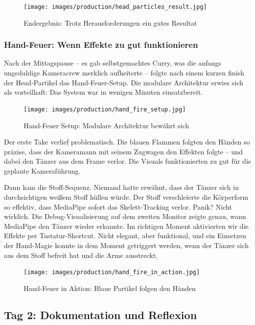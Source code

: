\begin{figure}[h]
   \centering
   \texttt{[image: images/production/head\_particles\_result.jpg]}
   \caption{Endergebnis: Trotz Herausforderungen ein gutes Resultat}
   \label{fig:head_result}
\end{figure}

\subsubsection{Hand-Feuer: Wenn Effekte zu gut funktionieren}

Nach der Mittagspause – es gab selbstgemachtes Curry, was die anfangs ungeduldige Kameracrew merklich aufheiterte – folgte nach einem kurzen finish der Head-Partikel das Hand-Feuer-Setup. Die modulare Architektur erwies sich als vorteilhaft: Das System war in wenigen Minuten einsatzbereit.

\begin{figure}[h]
   \centering
   \texttt{[image: images/production/hand\_fire\_setup.jpg]}
   \caption{Hand-Feuer Setup: Modulare Architektur bewährt sich}
   \label{fig:hand_fire_setup}
\end{figure}

Der erste Take verlief problematisch. Die blauen Flammen folgten den Händen so präzise, dass der Kameramann mit seinem Zugwagen den Effekten folgte – und dabei den Tänzer aus dem Frame verlor. Die Visuals funktionierten zu gut für die geplante Kameraführung.

Dann kam die Stoff-Sequenz. Niemand hatte erwähnt, dass der Tänzer sich in durchsichtigen weißem Stoff hüllen würde. Der Stoff verschleierte die Körperform so effektiv, dass MediaPipe sofort das Skelett-Tracking verlor. Panik? Nicht wirklich. Die Debug-Visualisierung auf dem zweiten Monitor zeigte genau, wann MediaPipe den Tänzer wieder erkannte. Im richtigen Moment aktivierten wir die Effekte per Tastatur-Shortcut. Nicht elegant, aber funktional, und ein Einsetzen der Hand-Magie konnte in dem Moment getriggert werden, wenn der Tänzer sich aus dem Stoff befreit hat und die Arme ausstreckt.

\begin{figure}[h]
   \centering
   \texttt{[image: images/production/hand\_fire\_in\_action.jpg]}
   \caption{Hand-Feuer in Aktion: Blaue Partikel folgen den Händen}
   \label{fig:hand_fire_action}
\end{figure}

\subsection{Tag 2: Dokumentation und Reflexion}

